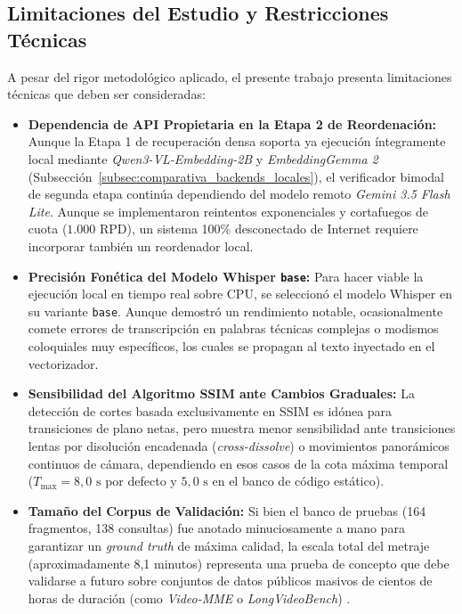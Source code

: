 \subsection{Limitaciones del Estudio y Restricciones Técnicas}
\label{subsec:limitaciones_estudio}

A pesar del rigor metodológico aplicado, el presente trabajo presenta limitaciones técnicas que deben ser consideradas:

\begin{itemize}
    \item \textbf{Dependencia de API Propietaria en la Etapa 2 de Reordenación:} Aunque la Etapa 1 de recuperación densa soporta ya ejecución íntegramente local mediante \textit{Qwen3-VL-Embedding-2B} y \textit{EmbeddingGemma 2} (Subsección~\ref{subsec:comparativa_backends_locales}), el verificador bimodal de segunda etapa continúa dependiendo del modelo remoto \textit{Gemini 3.5 Flash Lite}. Aunque se implementaron reintentos exponenciales y cortafuegos de cuota ($1.000\text{ RPD}$), un sistema 100\% desconectado de Internet requiere incorporar también un reordenador local.
    \item \textbf{Precisión Fonética del Modelo Whisper \texttt{base}:} Para hacer viable la ejecución local en tiempo real sobre CPU, se seleccionó el modelo Whisper en su variante \texttt{base}. Aunque demostró un rendimiento notable, ocasionalmente comete errores de transcripción en palabras técnicas complejas o modismos coloquiales muy específicos, los cuales se propagan al texto inyectado en el vectorizador.
    \item \textbf{Sensibilidad del Algoritmo SSIM ante Cambios Graduales:} La detección de cortes basada exclusivamente en SSIM es idónea para transiciones de plano netas, pero muestra menor sensibilidad ante transiciones lentas por disolución encadenada (\textit{cross-dissolve}) o movimientos panorámicos continuos de cámara, dependiendo en esos casos de la cota máxima temporal ($T_{\max} = 8,0\text{ s}$ por defecto y $5,0\text{ s}$ en el banco de código estático).
    \item \textbf{Tamaño del Corpus de Validación:} Si bien el banco de pruebas (164 fragmentos, 138 consultas) fue anotado minuciosamente a mano para garantizar un \textit{ground truth} de máxima calidad, la escala total del metraje (aproximadamente 8,1 minutos) representa una prueba de concepto que debe validarse a futuro sobre conjuntos de datos públicos masivos de cientos de horas de duración (como \textit{Video-MME} o \textit{LongVideoBench}) \cite{video_rag2024, rethinking_long_video2026}.
\end{itemize}
